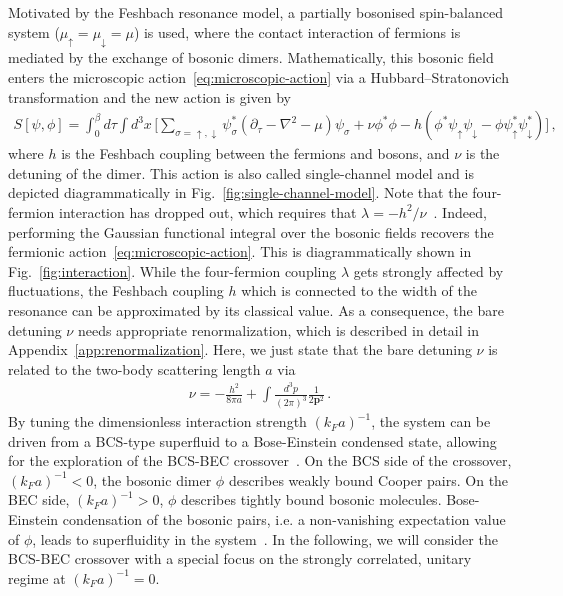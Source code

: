 Motivated by the Feshbach resonance model, a partially bosonised spin-balanced system ($\mu_{\uparrow}=\mu_{\downarrow}=\mu$) is used, where the contact interaction of fermions is mediated by the exchange of bosonic dimers. Mathematically, this bosonic field enters the microscopic action~\eqref{eq:microscopic-action} via a Hubbard–Stratonovich transformation and the new action is given by
%
\begin{align}
	\label{eq:single-channel-action}
	S[\psi, \phi] = \int_{0}^{\beta} d\tau \int d^3 x\,
	\Big[ \sum_{\sigma=\uparrow,\downarrow} \psi^*_{\sigma} (\partial_{\tau} - \nabla^2 - \mu) \psi_{\sigma}
	+ \nu \phi^* \phi - h (\phi^* \psi_{\uparrow} \psi_{\downarrow} - \phi \psi^*_{\uparrow} \psi^*_{\downarrow}) \Big] \,,
\end{align}
%
where $h$ is the Feshbach coupling between the fermions and bosons, and $\nu$ is the detuning of the dimer. This action is also called single-channel model and is depicted diagrammatically in Fig.~\ref{fig:single-channel-model}. Note that the four-fermion interaction has dropped out, which requires that $\lambda = - h^2 / \nu$~\cite{Floerchinger2009}. Indeed, performing the Gaussian functional integral over the bosonic fields recovers the fermionic action~\eqref{eq:microscopic-action}. This is diagrammatically shown in Fig.~\ref{fig:interaction}. While the four-fermion coupling $\lambda$ gets strongly affected by fluctuations, the Feshbach coupling $h$ which is connected to the width of the resonance can be approximated by its classical value. As a consequence, the bare detuning $\nu$ needs appropriate renormalization, which is described in detail in Appendix~\ref{app:renormalization}. Here, we just state that the bare detuning $\nu$ is related to the two-body scattering length $a$ via~\cite{Diehl2008,Haussmann2007,Frank2018-1}
%
\begin{align}
	\label{eq:renormalized-detuning}
	\nu = -\frac{h^2}{8\pi a} + \int\frac{d^3p}{(2\pi)^3} \frac{1}{2\bm{p}^2} \,.
\end{align}
%
By tuning the dimensionless interaction strength $(k_Fa)^{-1}$, the system can be driven from a BCS-type superfluid to a Bose-Einstein condensed state, allowing for the exploration of the BCS-BEC crossover~\cite{Randeria2014}. On the BCS side of the crossover, $(k_Fa)^{-1}<0$, the bosonic dimer $\phi$ describes weakly bound Cooper pairs. On the BEC side, $(k_Fa)^{-1}>0$, $\phi$ describes tightly bound bosonic molecules. Bose-Einstein condensation of the bosonic pairs, i.e. a non-vanishing expectation value of $\phi$, leads to superfluidity in the system~\cite{SadeMelo1993}. In the following, we will consider the BCS-BEC crossover with a special focus on the strongly correlated, unitary regime at $(k_Fa)^{-1}=0$.

